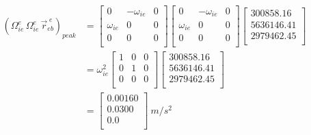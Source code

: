 \begin{parts}
    \begin{equation*}
        \begin{split}
            (\Omega^{e}_{ie}\,\Omega^{e}_{ie}\,\vec{r}^{\;e}_{eb})_{peak} & =
            \begin{bmatrix}
                0           & -\omega_{ie} & 0 \\
                \omega_{ie} & 0            & 0 \\
                0           & 0            & 0 \\
            \end{bmatrix}
            \begin{bmatrix}
                0           & -\omega_{ie} & 0 \\
                \omega_{ie} & 0            & 0 \\
                0           & 0            & 0 \\
            \end{bmatrix}
            \begin{bmatrix}
                300858.16  \\
                5636146.41 \\
                2979462.45 \\
            \end{bmatrix} \\
            & = \omega_{ie}^2
            \begin{bmatrix}
                1 & 0 & 0 \\
                0 & 1 & 0 \\
                0 & 0 & 0 \\
            \end{bmatrix}
            \begin{bmatrix}
                300858.16  \\
                5636146.41 \\
                2979462.45 \\
            \end{bmatrix} \\
            & =
            \begin{bmatrix}
                0.00160 \\
                0.0300  \\
                0.0     \\
            \end{bmatrix}~\unit{m/s^2} \\
        \end{split}
    \end{equation*}


\end{parts}
